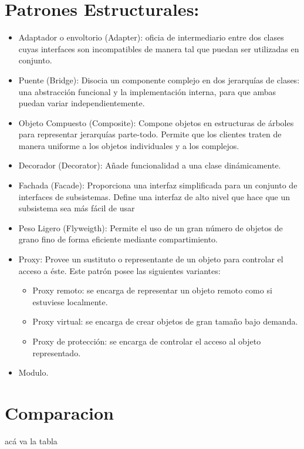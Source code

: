 \documentclass[10pt]{article}
\begin{document}
\section{Patrones Estructurales:}
\begin{itemize}


\item Adaptador o envoltorio (Adapter): oficia de intermediario entre dos clases cuyas interfaces 
son incompatibles de manera tal que puedan ser utilizadas en 
conjunto. 
\item Puente (Bridge): Disocia un componente complejo en dos jerarquías de 
clases: una abstracción funcional y la implementación interna, para 
que ambas puedan variar independientemente.
\item Objeto Compuesto (Composite): Compone objetos en estructuras de árboles para 
representar jerarquías parte-todo. Permite que los clientes traten de 
manera uniforme a los objetos individuales y a los complejos. 
\item Decorador (Decorator): Añade funcionalidad a una clase dinámicamente.
\item Fachada (Facade): Proporciona una interfaz simplificada para un conjunto de 
interfaces de subsistemas. Define una interfaz de alto nivel que 
hace que un subsistema sea más fácil de usar
\item Peso Ligero (Flyweigth): Permite el uso de un gran número de objetos de grano 
fino de forma eficiente mediante compartimiento.
\item Proxy: Provee un sustituto o representante de un objeto para 
controlar el acceso a éste. Este patrón posee las siguientes variantes:
\begin{itemize} 
\item Proxy remoto: se encarga de representar un objeto remoto 
como si estuviese localmente. 
\item Proxy virtual: se encarga de crear objetos de gran tamaño bajo 
demanda. 
\item Proxy de protección: se encarga de controlar el acceso al objeto 
representado.
\end{itemize}

\item Modulo.

\end{itemize}






\newpage
\section{Comparacion}
acá va la tabla
\end{document}
